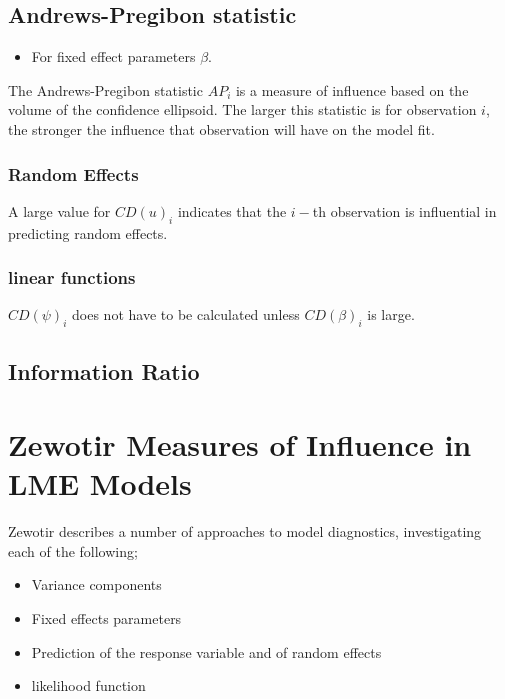 \documentclass[12pt, a4paper]{report}
\begin{document}
\subsection{Andrews-Pregibon statistic} %
\begin{itemize}
	\item For fixed effect parameters $\beta$.
\end{itemize}
The Andrews-Pregibon statistic $AP_{i}$ is a measure of influence based on the volume of the confidence ellipsoid.
The larger this statistic is for observation $i$, the stronger the influence that observation will have on the model fit.




\subsubsection{Random Effects}

A large value for $CD(u)_i$ indicates that the $i-$th observation is influential in predicting random effects.

\subsubsection{linear functions}

$CD(\psi)_i$ does not have to be calculated unless $CD(\beta)_i$ is large.


\subsection{Information Ratio}



\section{Zewotir Measures of Influence in LME Models}%
Zewotir describes a number of approaches to model diagnostics, investigating each of the following;
\begin{itemize}
	\item Variance components
	\item Fixed effects parameters
	\item Prediction of the response variable and of random effects
	\item likelihood function
\end{itemize}




\end{document}
